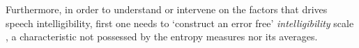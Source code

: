\begin{comment}
	
	First, as previous paragraphs reveal, the intelligibility scores are `complex' in nature, however, such `complexity' is rarely fully considered in the statistical modeling procedure. The problem with the later is that, because the data does not fulfill the typical assumptions, e.g. normality, its analysis under such models might lead us to erroneous conclusions \textcolor{red}{[citation]}. On the one hand, outcomes such as the number of (un)intelligible words are discrete, while the entropy scores are continuous in nature. In addition, there is the consideration that both scores are constraint in specific bounds, i.e. the number of (un)intelligible words cannot be negative, while the entropy scores are in the bounds between zero and one. Finally, given the rating procedure's nature, the scores are produced in a clustered manner, i.e. we observe several score measurements per child. 
	
	So far the literature shows that, even when the data does not conform to the `normality' assumption, the applied statistical procedures are still supported on it, examples of this can be seen in \citet{Boonen_et_al_2021, Flipsen_et_al_2006} and \citet{Hustad_et_al_2020}. In addition, some papers in the literature have even used (hierarchical) multilevel modeling to deal with the clustered nature of the data, e.g. \citet{Boonen_et_al_2021}. However, to the authors knowledge, no paper have dealt with all of the data nuances at once, which leads us to believe that, by using more sophisticated statistical models we could improve our statistical inferences. 

\end{comment}

Furthermore, in order to understand or intervene on the factors that drives speech intelligibility, first one needs to `construct an error free' \textit{intelligibility} scale \cite{Carroll_2006}, a characteristic not possessed by the entropy measures nor its averages.

